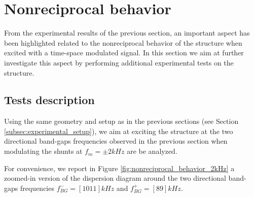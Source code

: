 \section{Nonreciprocal behavior}
\label{sec:nonreciprocal_behavior}

From the experimental results of the previous section, an important aspect has been highlighted related to the nonreciprocal behavior of the structure when excited with a time-space modulated signal.
In this section we aim at further investigate this aspect by performing additional experimental tests on the structure.



\subsection{Tests description}
\label{subsec:nonreciprocal_behavior_setup}

Using the same geometry and setup as in the previous sections (see Section \ref{subsec:experimental_setup}), we aim at exciting the structure at the two directional band-gaps frequencies observed in the previous section when modulating the shunts at $f_m = \pm 2 kHz$ are be analyzed.

For convenience, we report in Figure \ref{fig:nonreciprocal_behavior_2kHz} a zoomed-in version of the dispersion diagram around the two directional band-gaps frequencies $f_{BG}^- = [10 11] kHz$ and $f_{BG}^+ = [8 9] kHz$.

